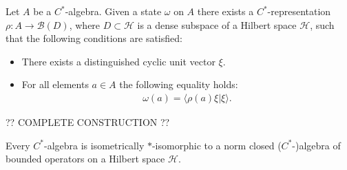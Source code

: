     \begin{construct}\label{operators:gns}
        Let $A$ be a $C^*$-algebra. Given a state $\omega$ on $A$ there exists a $C^*$-representation $\rho:A\rightarrow\mathcal{B}(D)$, where $D\subset\mathcal{H}$ is a dense subspace of a Hilbert space $\mathcal{H}$, such that the following conditions are satisfied:
        \begin{itemize}
            \item There exists a distinguished cyclic unit vector $\xi$.
            \item For all elements $a\in A$ the following equality holds:
                \begin{gather}
                    \omega(a) = \langle\rho(a)\xi|\xi\rangle.
                \end{gather}
        \end{itemize}

        ?? COMPLETE CONSTRUCTION ??
    \end{construct}

    \begin{theorem}\label{operators:gelfand_naimark}
        Every $C^*$-algebra is isometrically $\ast$-isomorphic to a norm closed ($C^*$-)algebra of bounded operators on a Hilbert space $\mathcal{H}$.
    \end{theorem}

\subsection{}


